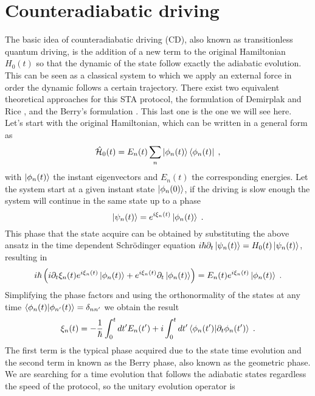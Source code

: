 \section{\label{sec:CD}Counteradiabatic driving}
The basic idea of counteradiabatic driving (CD), also known as transitionless quantum driving, is the addition of a new term to the original Hamiltonian $H_0(t)$ so that the dynamic of the state follow exactly the adiabatic evolution. This can be seen as a classical system to which we apply an external force in order the dynamic follows a certain trajectory. There exist two equivalent theoretical approaches for this STA protocol, the formulation of Demirplak and Rice \cite{Demirplak2003}, and the Berry's formulation \cite{Berry2009}. This last one is the one we will see here. Let's start with the original Hamiltonian, which can be written in a general form as
\begin{equation}
	\hat{\mathcal{H}}_0(t)=E_n(t)\sum_n\ket{\phi_n(t)}\bra{\phi_n(t)}\; ,
\end{equation}
with $\ket{\phi_n(t)}$ the instant eigenvectors and $E_n(t)$ the corresponding energies. Let the system start at a given instant state $\ket{\phi_n(0)}$, if the driving is slow enough the system will continue in the same state up to a phase
\begin{equation}
	\ket{\psi_n(t)}=e^{i\xi_n(t)}\ket{\phi_n(t)}\;.
\end{equation}
This phase that the state acquire can be obtained by substituting the above ansatz in the time dependent Schrödinger equation $i\hbar\partial_t\ket{\psi_n(t)}=H_0(t)\ket{\psi_n(t)}$, resulting in
\begin{equation}
	i\hbar\left(i\partial_t\xi_n(t)e^{i\xi_n(t)}\ket{\phi_n(t)}+e^{i\xi_n(t)}\partial_t\ket{\phi_n(t)}\right)=E_n(t)e^{i\xi_n(t)}\ket{\phi_n(t)}\; .
\end{equation}
Simplifying the phase factors and using the orthonormality of the states at any time $\braket{\phi_n(t)}{\phi_{n'}(t)}=\delta_{nn'}$ we obtain the result
\begin{equation}
	\xi_n(t)=-\frac{1}{\hbar}\int_0^tdt'E_n(t')+i\int_0^tdt'\braket{\phi_n(t')}{\partial_t \phi_n(t')}\; .
	\label{eq:Berry_phase}
\end{equation}
The first term is the typical phase acquired due to the state time evolution and the second term in known as the Berry phase, also known as the geometric phase. We are searching for a time evolution that follows the adiabatic states regardless the speed of the protocol, so the unitary evolution operator is
